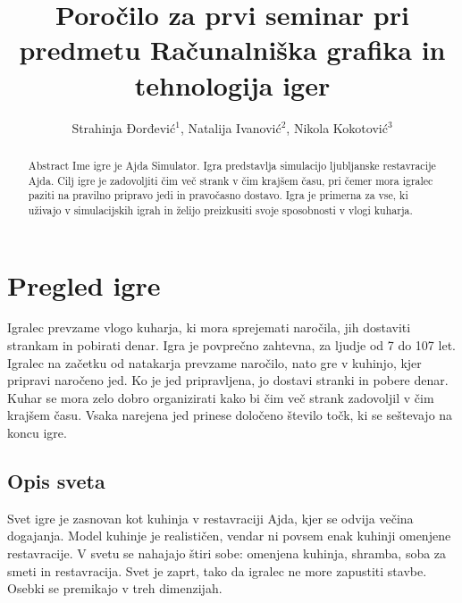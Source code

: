 \documentclass[a4paper]{article}
\begin{document}
\title{Poročilo za prvi seminar pri predmetu Računalniška grafika in tehnologija iger}

\author{Strahinja Đorđević$^{1}$, Natalija Ivanović$^{2}$, Nikola Kokotović$^{3}$ }



\maketitle


\begin{abstract}{Abstract}
Ime igre je Ajda Simulator. Igra predstavlja simulacijo ljubljanske restavracije Ajda.
Cilj igre je zadovoljiti čim več strank v čim krajšem času, pri čemer mora igralec paziti na pravilno pripravo jedi in pravočasno dostavo.  
Igra je primerna za vse, ki uživajo v simulacijskih igrah in želijo preizkusiti svoje sposobnosti v vlogi kuharja.
\end{abstract}

\section{Pregled igre}
Igralec prevzame vlogo kuharja, ki mora sprejemati naročila, jih dostaviti strankam in pobirati denar.
Igra je povprečno zahtevna, za ljudje od 7 do 107 let.
Igralec na začetku od natakarja prevzame naročilo, nato gre v kuhinjo, kjer pripravi naročeno jed. Ko je jed pripravljena, jo dostavi stranki in pobere denar.
Kuhar se mora zelo dobro organizirati kako bi čim več strank zadovoljil v čim krajšem času.
Vsaka narejena jed prinese določeno število točk, ki se seštevajo na koncu igre.

\subsection{Opis sveta}
Svet igre je zasnovan kot kuhinja v restavraciji Ajda, kjer se odvija večina dogajanja. Model kuhinje je realističen, vendar ni povsem enak kuhinji omenjene restavracije. 
V svetu se nahajajo štiri sobe: omenjena kuhinja, shramba, soba za smeti in restavracija. Svet je zaprt, tako da igralec ne more zapustiti stavbe.
Osebki se premikajo v treh dimenzijah.
\end{document}
